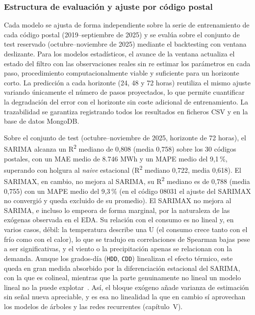 \documentclass[12pt, a4paper]{article}
\begin{document}
\subsubsection{Estructura de evaluación y ajuste por código postal}

Cada modelo se ajusta de forma independiente sobre la serie de entrenamiento de cada código postal (2019--septiembre de 2025) y se evalúa sobre el conjunto de test reservado (octubre--noviembre de 2025) mediante el  backtesting con ventana deslizante. Para los modelos estadísticos, el avance de la ventana actualiza el estado del filtro con las observaciones reales sin re estimar los parámetros en cada paso, procedimiento computacionalmente viable y suficiente para un horizonte corto. La predicción a cada horizonte (24, 48 y 72 horas) reutiliza el mismo ajuste variando únicamente el número de pasos proyectados, lo que permite cuantificar la degradación del error con el horizonte sin coste adicional de entrenamiento. La trazabilidad se garantiza registrando todos los resultados en ficheros CSV y en la base de datos MongoDB.

Sobre el conjunto de test (octubre--noviembre de 2025, horizonte de 72 horas), el SARIMA alcanza un R\textsuperscript{2} mediano de 0,808 (media 0,758) sobre los 30 códigos postales, con un MAE medio de 8.746 MWh y un MAPE medio del 9,1\,\%, superando con holgura al \textit{naive} estacional (R\textsuperscript{2} mediano 0,722, media 0,618). El SARIMAX, en cambio, no mejora al SARIMA, su R\textsuperscript{2} mediano es de 0,788 (media 0,755) con un MAPE medio del 9,3\,\% (en el código 08031 el ajuste del SARIMAX no convergió y queda excluido de su promedio). El SARIMAX no mejora al SARIMA, e incluso lo empeora de forma marginal, por la naturaleza de las exógenas observada en el EDA. Su relación con el consumo es no lineal y, en varios casos, débil: la temperatura describe una U (el consumo crece tanto con el frío como con el calor), lo que se tradujo en correlaciones de Spearman bajas pese a ser significativas, y el viento o la precipitación apenas se relacionan con la demanda. Aunque los grados-día (\texttt{HDD}, \texttt{CDD}) linealizan el efecto térmico, este queda en gran medida absorbido por la diferenciación estacional del SARIMA, con la que es colineal, mientras que la parte genuinamente no lineal un modelo lineal no la puede explotar~\cite{pardo2002}. Así, el bloque exógeno añade varianza de estimación sin señal nueva apreciable, y es esa no linealidad la que en cambio sí aprovechan los modelos de árboles y las redes recurrentes (capítulo~V).
\end{document}
